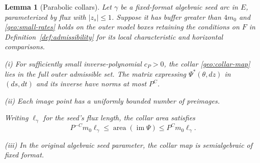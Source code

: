 \documentclass[11pt]{amsart}
\newtheorem{lemma}[theorem]{Lemma}
\theoremstyle{definition}
\theoremstyle{remark}
\numberwithin{equation}{section}
\begin{document}
\begin{lemma}[Parabolic collars]\label{geo:collar}
Let $\gamma$ be a fixed-format algebraic seed arc in $E$, parameterized by flux with $|z_s|\le1$. Suppose it has buffer greater than $4m_0$ and \eqref{geo:small-rates} holds on the outer model boxes retaining the conditions on $F$ in Definition~\ref{def:admissibility} for its local characteristic and horizontal comparisons.

\noindent\textup{(i)} For sufficiently small inverse-polynomial $c_P>0$, the collar \eqref{geo:collar-map} lies in the full outer admissible set.  The matrix expressing $\Psi^*(\theta,dz)$ in $(ds,dt)$ and its inverse have norms at most $P^C$.

\noindent\textup{(ii)} Each image point has a uniformly bounded number of preimages.

Writing $\ell_\gamma$ for the seed's flux length, the collar area satisfies
\[
P^{-C}m_0\ell_\gamma\le\operatorname{area}(\operatorname{im}\Psi)\le P^Cm_0\ell_\gamma.
\]

\noindent\textup{(iii)} In the original algebraic seed parameter, the collar map is semialgebraic of fixed format.
\end{lemma}
\end{document}
